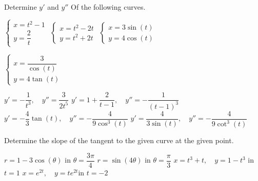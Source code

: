 \ifcalculus
\begin{Exercise}[difficulty = 1] Determine $y'$ and $y''$ Of the following curves.
\begin{multicols}{2}
    \Question $\left\{\begin{array}{l} x = t^2 - 1 \\ y = \dfrac{2}{t} \end{array}\right. $	
	\Question $\left\{\begin{array}{l} x = t^2 - 2t \\ y = t^2 + 2t \end{array}\right. $	
	\Question $\left\{\begin{array}{l} x = 3 \sin(t) \\ y = 4 \cos(t) \end{array}\right. $
	
	\Question $\left\{\begin{array}{l} x = \dfrac{3}{\cos(t)} \\ y = 4 \tan(t) \end{array}\right. $
	\EndCurrentQuestion
	\end{multicols}

\end{Exercise}

\begin{Answer}\phantom{}
    \begin{multicols}{2}
    	
        \Question $y' = -\dfrac{1}{t^3}, \quad y''=  \dfrac{3}{2t^5} $	
    	\Question $y' = 1 + \dfrac{2}{t-1}, \quad y''=  -\dfrac{1}{(t-1)^3} $	
    	\Question $y' = - \dfrac{4}{3} \tan(t), \quad y'' = - \dfrac{4}{9 \cos^3(t)}$
    	\Question $y' =  \dfrac{4}{3 \sin(t)} , \quad y'' = - \dfrac{4}{9 \cot^3(t)}$
    	\EndCurrentQuestion
	\end{multicols}
\end{Answer}
\fi	


\begin{Exercise} Determine the slope of the tangent to the given curve at the given point.
    \begin{multicols}{2}
    	\ifanalysis\Question[difficulty = 1]\fi\ifcalculus\Question[difficulty = 2]\fi $r=1-3 \cos(\theta) $ \quad in $\theta = \dfrac{3 \pi}{4}$ %
    	\ifanalysis\Question[difficulty = 1]\fi\ifcalculus\Question[difficulty = 2]\fi $r=\sin(4\theta) $ \quad in $\theta = \dfrac{\pi}{3}$ 
		\Question[difficulty = 1] $x = t^3+t, \quad y=1-t^3$ \quad in $t=1$ 
		\Question[difficulty = 1] $x =e^{2t}, \quad y=te^{2t}$\quad  in $t=-2$ 
		\EndCurrentQuestion
	\end{multicols}
	
\end{Exercise}

